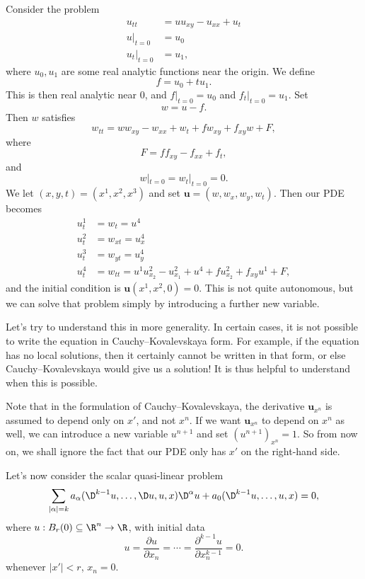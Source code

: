 \documentclass[a4paper]{article}
\begin{document}
\begin{eg}
  Consider the problem
  \begin{align*}
    u_{tt} &= uu_{xy} - u_{xx} + u_t\\
    u|_{t = 0} &= u_0\\
    u_t|_{t = 0} &= u_1,
  \end{align*}
  where $u_0, u_1$ are some real analytic functions near the origin. We define
  \[
    f = u_0 + t u_1.
  \]
  This is then real analytic near $0$, and $f|_{t = 0} = u_0$ and $f_t|_{t = 0} = u_1$. Set
  \[
    w = u - f.
  \]
  Then $w$ satisfies
  \[
    w_{tt} = ww_{xy} - w_{xx} + w_t + f w_{xy} + f_{xy}w + F,
  \]
  where
  \[
    F = ff_{xy} - f_{xx} + f_t,
  \]
  and
  \[
    w|_{t = 0} = w_t|_{t = 0} = 0.
  \]
  We let $(x, y, t) = (x^1, x^2, x^3)$ and set $\mathbf{u} = (w, w_x, w_y, w_t)$. Then our PDE becomes
  \begin{align*}
    u^1_t &= w_t = u^4\\
    u^2_t &= w_{xt} = u^4_x \\
    u^3_t &= w_{yt} = u^4_y\\
    u^4_t &= w_{tt} = u^1 u^2_{x_2} - u^2_{x_1} + u^4 + f u_{x_2}^2 + f_{xy}u^1 + F,
  \end{align*}
  and the initial condition is $\mathbf{u}(x^1, x^2, 0) = 0$. This is not quite autonomous, but we can solve that problem simply by introducing a further new variable.
\end{eg}

Let's try to understand this in more generality. In certain cases, it is not possible to write the equation in Cauchy--Kovalevskaya form. For example, if the equation has no local solutions, then it certainly cannot be written in that form, or else Cauchy--Kovalevskaya would give us a solution! It is thus helpful to understand when this is possible.

Note that in the formulation of Cauchy--Kovalevskaya, the derivative $\mathbf{u}_{x^n}$ is assumed to depend only on $x'$, and not $x^n$. If we want $\mathbf{u}_{x^n}$ to depend on $x^n$ as well, we can introduce a new variable $u^{n + 1}$ and set $(u^{n + 1})_{x^n} = 1$. So from now on, we shall ignore the fact that our PDE only has $x'$ on the right-hand side.

Let's now consider the scalar quasi-linear problem
\[
  \sum_{|\alpha| = k} a_\alpha(\D^{k - 1} u, \ldots, \D u, u, x) \D^\alpha u + a_0(\D^{k - 1}u, \ldots, u, x) = 0,
\]
where $u: B_r(0) \subseteq \R^n \to \R$, with initial data
\[
  u = \frac{\partial u}{\partial x_n} = \cdots = \frac{\partial^{k - 1} u}{\partial x_n^{k - 1}} = 0.
\]
whenever $|x'| < r$, $x_n = 0$.
\end{document}

